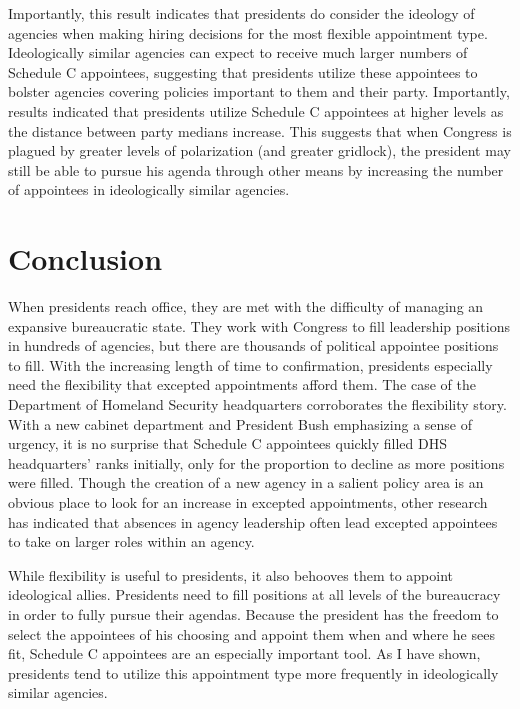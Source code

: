 \documentclass[12pt]{article}
\begin{document}
Importantly, this result indicates that presidents do consider the ideology of agencies when making hiring decisions for the most flexible appointment type. Ideologically similar agencies can expect to receive much larger numbers of Schedule C appointees, suggesting that presidents utilize these appointees to bolster agencies covering policies important to them and their party. Importantly, results indicated that presidents utilize Schedule C appointees at higher levels as the distance between party medians increase. This suggests that when Congress is plagued by greater levels of polarization (and greater gridlock), the president may still be able to pursue his agenda through other means by increasing the number of appointees in ideologically similar agencies. 

\section*{Conclusion}	
When presidents reach office, they are met with the difficulty of managing an expansive bureaucratic state. They work with Congress to fill leadership positions in hundreds of agencies, but there are thousands of political appointee positions to fill. With the increasing length of time to confirmation, presidents especially need the flexibility that excepted appointments afford them. The case of the Department of Homeland Security headquarters corroborates the flexibility story. With a new cabinet department and President Bush emphasizing a sense of urgency, it is no surprise that Schedule C appointees quickly filled DHS headquarters' ranks initially, only for the proportion to decline as more positions were filled. Though the creation of a new agency in a salient policy area is an obvious place to look for an increase in excepted appointments, other research has indicated that absences in agency leadership often lead excepted appointees to take on larger roles within an agency. 

While flexibility is useful to presidents, it also behooves them to appoint ideological allies. Presidents need to fill positions at all levels of the bureaucracy in order to fully pursue their agendas. Because the president has the freedom to select the appointees of his choosing and appoint them when and where he sees fit, Schedule C appointees are an especially important tool. As I have shown, presidents tend to utilize this appointment type more frequently in ideologically similar agencies. 
\end{document}
